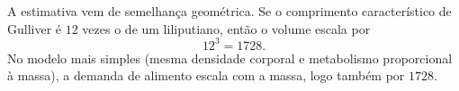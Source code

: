 A estimativa vem de semelhança geométrica. Se o comprimento característico de Gulliver é $12$ vezes o de um liliputiano, então o volume escala por
\[
12^3 = 1728.
\]
No modelo mais simples (mesma densidade corporal e metabolismo proporcional à massa), a demanda de alimento escala com a massa, logo também por $1728$.

